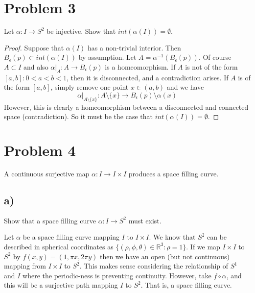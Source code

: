 \documentclass{article}
\theoremstyle{definition}
\begin{document}
\section*{Problem 3}
\begin{mdframed}
    Let $\alpha : I \rightarrow S^2$ be injective. Show that $int(\alpha(I)) = \emptyset$.
\end{mdframed}
\begin{proof}
    Suppose that $\alpha(I)$ has a non-trivial interior. Then $B_\epsilon(p) \subset int(\alpha(I))$ by assumption. Let $A = \alpha^{-1}(B_\epsilon(p))$.
    Of course $A \subset I$ and also $\alpha|_A : A \rightarrow B_\epsilon(p)$ is a homeomorphism. If $A$ is not of the form $[a,b] : 0<a<b<1$,
    then it is disconnected, and a contradiction arises. If $A$ is of the form $[a,b]$, simply remove one point $x \in (a,b)$ and we have \[\alpha|_{A \setminus \{x\}}: A \setminus \{x\} \rightarrow B_\epsilon(p) \setminus \alpha(x)\]
    However, this is clearly a homeomorphism between a disconnected and connected space (contradiction). So it must be the case that $int(\alpha(I)) = \emptyset$.
\end{proof}
\section*{Problem 4}
A continuous surjective map $\alpha : I \rightarrow I \times I$ produces a space filling curve.
\subsection*{a)}
\begin{mdframed}
    Show that a space filling curve $\alpha : I \rightarrow S^2$ must exist.
\end{mdframed}
Let $\alpha$ be a space filling curve mapping $I$ to $I \times I$. We know that $S^2$ can be described in spherical coordinates as $\{(\rho, \phi, \theta) \in \mathbb{R}^3 : \rho = 1 \}$.
If we map $I \times I$ to $S^2$ by $f(x,y) = (1, \pi x, 2\pi y)$ then we have an open (but not continuous) mapping from $I \times I$ to $S^2$.
This makes sense considering the relationship of $S^1$ and $I$ where the periodic-ness is preventing continuity. However, take $f \circ \alpha$,
and this will be a surjective path mapping $I$ to $S^2$. That is, a space filling curve.
\end{document}
